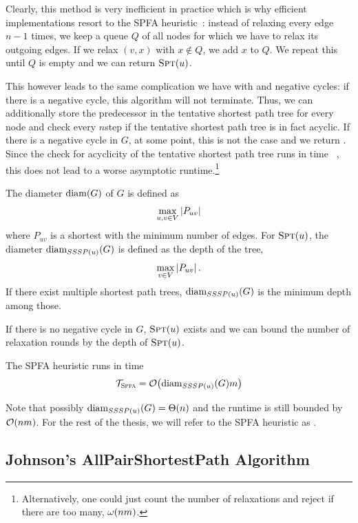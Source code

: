 Clearly, this method is very inefficient in practice which is why efficient implementations resort to the SPFA heuristic~\cite{SPFA}:
instead of relaxing every edge $n - 1$ times, we keep a queue $Q$ of all nodes for which we have to relax its outgoing edges.
If we relax $(v, x)$ with $x \notin Q$, we add $x$ to $Q$.
We repeat this until $Q$ is empty and we can return $\textsc{Spt}(u)$.

This however leads to the same complication we have with \algdk and negative cycles: if there is a negative cycle, this algorithm will not terminate.
Thus, we can additionally store the predecessor in the tentative shortest path tree for every node and check every $n$\th step if the tentative shortest path tree is in fact acyclic.
If there is a negative cycle in $G$, at some point, this is not the case and we return \negcycle.
Since the check for acyclicity of the tentative shortest path tree runs in time ~\cite{toposort}, this does not lead to a worse asymptotic runtime.\footnote{
  Alternatively, one could just count the number of relaxations and reject if there are too many, \ie $\omega\!\left(nm\right)$.
}

\begin{definition}[Diameter]\label{def:diameter}
  The diameter $\mathrm{diam}(G)$ of $G$ is defined as \[
    \max_{u, v \in V}\left\lvert P_{uv}\right\rvert
  \] where $P_{uv}$ is a shortest  with the minimum number of edges.
  For $\textsc{Spt}(u)$, the diameter $\mathrm{diam}_{SSSP(u)}(G)$ is defined as the depth of the tree, \ie \[
    \max_{v \in V}\left\lvert P_{uv}\right\rvert.
  \]
  If there exist multiple shortest path trees, $\mathrm{diam}_{SSSP(u)}(G)$ is the minimum depth among those.
\end{definition}

\noindent If there is no negative cycle in $G$, $\textsc{Spt}(u)$ exists and we can bound the number of relaxation rounds by the depth of $\textsc{Spt}(u)$.
\begin{lemma}\label{lem:bellmanford_runtime}
  The SPFA heuristic runs in time \[
    \mathcal{T}_{\textsc{Spfa}} = \mathcal O\!\left(\mathrm{diam}_{SSSP(u)}(G)m\right)
  \]
\end{lemma}

\noindent Note that possibly $\mathrm{diam}_{SSSP(u)}(G) = \Theta\!\left(n\right)$ and the runtime is still bounded by $\mathcal O\!\left(nm\right)$.
For the rest of the thesis, we will refer to the SPFA heuristic as \algbf.

\subsection{Johnson's AllPairShortestPath Algorithm} \label{sec:johnson}

